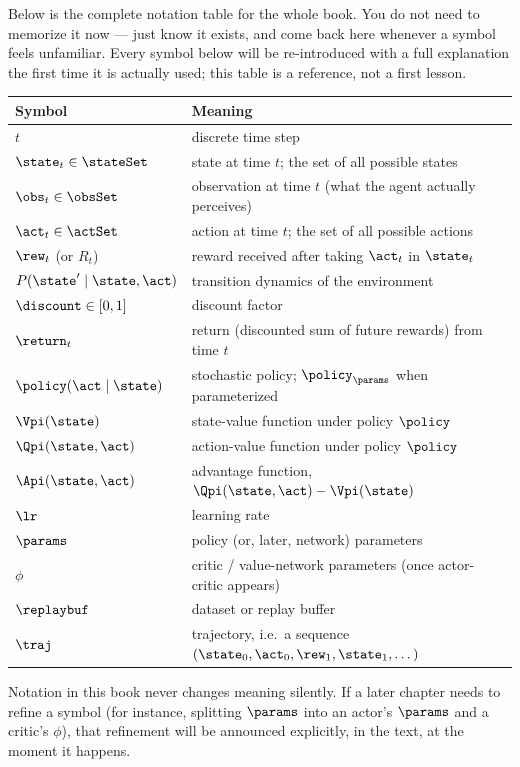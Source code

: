 Below is the complete notation table for the whole book. You do not need to
memorize it now — just know it exists, and come back here whenever a symbol
feels unfamiliar. Every symbol below will be re-introduced with a full
explanation the first time it is actually used; this table is a reference,
not a first lesson.

\begin{center}
\begin{tabular}{@{}ll@{}}
\toprule
\textbf{Symbol} & \textbf{Meaning} \\
\midrule
$t$ & discrete time step \\
$\state_t \in \stateSet$ & state at time $t$; the set of all possible states \\
$\obs_t \in \obsSet$ & observation at time $t$ (what the agent actually perceives) \\
$\act_t \in \actSet$ & action at time $t$; the set of all possible actions \\
$\rew_t$ (or $R_t$) & reward received after taking $\act_t$ in $\state_t$ \\
$P(\state' \mid \state, \act)$ & transition dynamics of the environment \\
$\discount \in [0,1]$ & discount factor \\
$\return_t$ & return (discounted sum of future rewards) from time $t$ \\
$\policy(\act \mid \state)$ & stochastic policy; $\policy_\params$ when parameterized \\
$\Vpi(\state)$ & state-value function under policy $\policy$ \\
$\Qpi(\state,\act)$ & action-value function under policy $\policy$ \\
$\Api(\state,\act)$ & advantage function, $\Qpi(\state,\act) - \Vpi(\state)$ \\
$\lr$ & learning rate \\
$\params$ & policy (or, later, network) parameters \\
$\phi$ & critic / value-network parameters (once actor-critic appears) \\
$\replaybuf$ & dataset or replay buffer \\
$\traj$ & trajectory, i.e.\ a sequence $(\state_0, \act_0, \rew_1, \state_1, \dots)$ \\
\bottomrule
\end{tabular}
\end{center}

\begin{remark}
Notation in this book never changes meaning silently. If a later chapter
needs to refine a symbol (for instance, splitting $\params$ into an actor's
$\params$ and a critic's $\phi$), that refinement will be announced
explicitly, in the text, at the moment it happens.
\end{remark}

